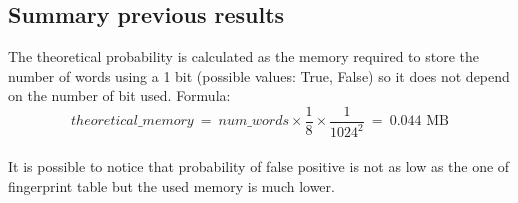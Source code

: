 \documentclass[twocolumn,letterpaper]{report}
\begin{document}
{					\newpage
					
			\subsection{Summary previous results}
			
\begin{table}[h!]
				\renewcommand{\arraystretch}{1.35}
\end{table}
\raggedbottom
\noindent
		The theoretical probability is calculated as the memory required to store the number of words using a 1 bit (possible values: True, False) so it does not depend on the number of bit used. Formula:
		\[ theoretical\_memory \: = \: num\_words \times \frac{1}{8} \times \frac{1}{1024^2} \: = \: 0.044 \text{ MB}\] \\
		It is possible to notice that probability of false positive is not as low as the one of fingerprint table but the used memory is much lower.
		
}
\end{document}

